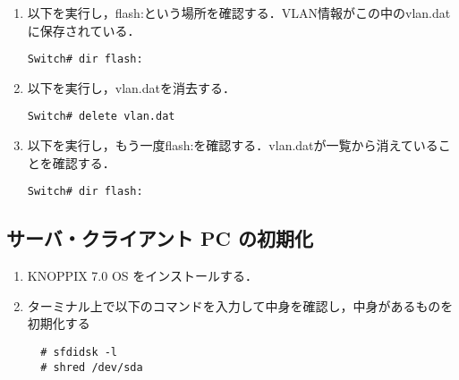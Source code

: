 \documentclass[a4j,titlepage]{jarticle}
\begin{document}
\begin{enumerate}
\begin{enumerate}
\item 以下を実行し，flash:という場所を確認する．VLAN情報がこの中のvlan.datに保存されている．
\begin{screen}
\begin{center}
\begin{verbatim}
Switch# dir flash:
\end{verbatim}
\end{center}
\end{screen}

\item 以下を実行し，vlan.datを消去する．
\begin{screen}
\begin{center}
\begin{verbatim}
Switch# delete vlan.dat
\end{verbatim}
\end{center}
\end{screen}

\item 以下を実行し，もう一度flash:を確認する．vlan.datが一覧から消えていることを確認する．
\begin{screen}
\begin{center}
\begin{verbatim}
Switch# dir flash:
\end{verbatim}
\end{center}
\end{screen}

\end{enumerate}

\subsection{サーバ・クライアント PC の初期化}
\begin{enumerate}

\item KNOPPIX 7.0 OS をインストールする．

\item ターミナル上で以下のコマンドを入力して中身を確認し，中身があるものを初期化する

  \begin{center}
    \begin{screen}
\begin{verbatim}
  # sfdidsk -l
  # shred /dev/sda
\end{verbatim}
    \end{screen}
    \end{center}


\end{enumerate}
\end{enumerate}
\end{document}
